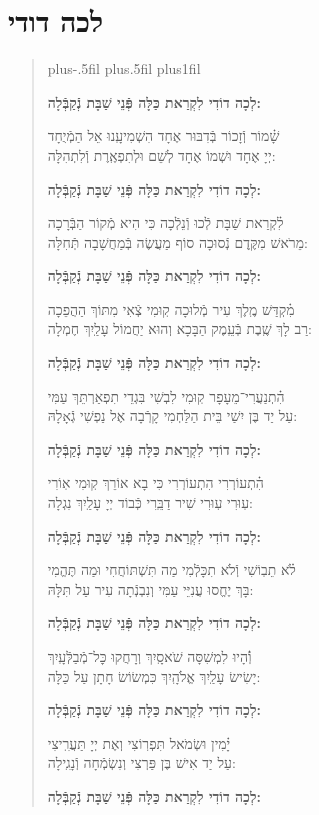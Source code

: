\documentclass[twoside, openany, parskip=half, 11pt]{book}
\begin{document}
\section*{ לכה דודי }

\newcommand{\lechadodi}{\textbf{לְכָה דוֹדִי לִקְרַאת כַּלָּה פְּֿנֵי שַׁבָּת נְֿקַבְּֿלָה:}}

\begin{quote}
 \leftskip=0pt plus-.5fil
 \rightskip=0pt plus.5fil
 \parfillskip=0pt plus1fil


\lechadodi

 שָׁ֗מוֹר וְֿזָכוֹר בְּֿדִבּוּר אֶחָד \hfill
הִשְׁמִיעָֽנוּ אֵל הַמְֿיֻחָד \\
יְיָ אֶחָד וּשְׁמוֹ אֶחָד \hfill
לְשֵׁם וּלְתִפְאֶֽרֶת וְֿלִתְהִלָּה:

\lechadodi

 לִ֗קְרַאת שַׁבָּת לְֿכוּ וְֿנֵלְֿכָה \hfill
כִּי הִיא מְֿקוֹר הַבְּֿרָכָה \\
מֵרֹאשׁ מִקֶּֽדֶם נְֿסוּכָה \hfill
סוֹף מַעֲשֶׂה בְּֿמַחֲשָׁבָה תְּֿחִלָּה:

\lechadodi

 מִ֗קְדַּשׁ מֶֽלֶךְ עִיר מְֿלוּכָה \hfill
קֽוּמִי צְֿאִי מִתּוֹךְ הַהֲפֵכָה \\
רַב לָךְ שֶֽׁבֶת בְּֿעֵֽמֶק הַבָּכָא \hfill
וְהוּא יַחֲמוֹל עָלַֽיִךְ חֶמְלָה:

\lechadodi

 הִ֗תְנַעֲרִי־מֵעָפָר קֽוּמִי \hfill
לִבְשִׁי בִּגְדֵי תִפְאַרְתֵּךְ עַמִּי \\
עַל יַד בֶּן יִשַׁי בֵּית הַלַּחְמִי \hfill
קָרְֿבָה אֶל נַפְשִׁי גְֿאָלָהּ:

\lechadodi

 הִ֗תְעוֹרְרִי הִתְעוֹרְרִי \hfill
כִּי בָא אוֹרֵךְ קֽוּמִי אֽוֹרִי \\
עֽוּרִי עֽוּרִי שִׁיר דַבֵּֽרִי \hfill
כְּֿבוֹד יְיָ עָלַֽיִךְ נִגְלָה:

\lechadodi

 לֹ֗א תֵבֽוֹשִׁי וְֿלֹא תִכָּלְֿמִי \hfill
מַה תִּשְׁתּוֹחֲחִי וּמַה תֶּהֱמִי \\
בָּךְ יֶחֱסוּ עֲנִיֵּי עַמִּי \hfill
וְנִבְנְֿתָה עִיר עַל תִּלָּהּ:

\lechadodi

 וְֿ֗הָיוּ לִמְשִׁסָּה שֹׁאסָֽיִךְ \hfill
וְרָחֲקוּ כׇּל־מְֿבַלְּֿעָֽיִךְ \\
יָשִׂישׂ עָלַֽיִךְ אֱלֹהָֽיִךְ \hfill
כִּמְשׂוֹשׂ חָתָן עַל כַּלָּה:

\lechadodi

 יָ֗מִין וּשְׂמֹאל תִּפְרֽוֹצִי \hfill
וְאֶת יְיָ תַּעֲרִֽיצִי \\
עַל יַד אִישׁ בֶּן פַּרְצִי \hfill
וְנִשְׂמְֿחָה וְֿנָגִֽילָה:

\lechadodi

\end{quote}
\end{document}
